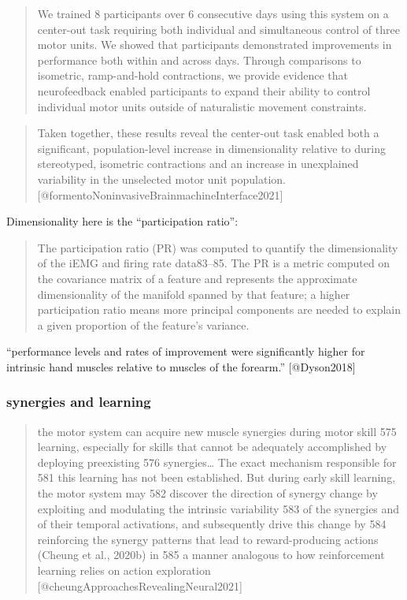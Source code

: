 \documentclass[../main.tex]{subfiles}
\begin{document}
{{{{{{{{{{{\begin{quote}
We trained 8 participants over 6 consecutive days using this system on a
center-out task requiring both individual and simultaneous control of
three motor units. We showed that participants demonstrated improvements
in performance both within and across days. Through comparisons to
isometric, ramp-and-hold contractions, we provide evidence that
neurofeedback enabled participants to expand their ability to control
individual motor units outside of naturalistic movement constraints.
\end{quote}

\begin{quote}
Taken together, these results reveal the center-out task enabled both a
significant, population-level increase in dimensionality relative to
during stereotyped, isometric contractions and an increase in
unexplained variability in the unselected motor unit population.
{[}@formentoNoninvasiveBrainmachineInterface2021{]}
\end{quote}

Dimensionality here is the ``participation ratio'':

\begin{quote}
The participation ratio (PR) was computed to quantify the dimensionality
of the iEMG and firing rate data83--85. The PR is a metric computed on
the covariance matrix of a feature and represents the approximate
dimensionality of the manifold spanned by that feature; a higher
participation ratio means more principal components are needed to
explain a given proportion of the feature's variance.
\end{quote}

``performance levels and rates of improvement were significantly higher
for intrinsic hand muscles relative to muscles of the forearm.''
{[}@Dyson2018{]}

\subsubsection{synergies and learning}\label{synergies-and-learning}

\begin{quote}
the motor system can acquire new muscle synergies during motor skill 575
learning, especially for skills that cannot be adequately accomplished
by deploying preexisting 576 synergies\ldots{} The exact mechanism
responsible for 581 this learning has not been established. But during
early skill learning, the motor system may 582 discover the direction of
synergy change by exploiting and modulating the intrinsic variability
583 of the synergies and of their temporal activations, and subsequently
drive this change by 584 reinforcing the synergy patterns that lead to
reward-producing actions (Cheung et al., 2020b) in 585 a manner
analogous to how reinforcement learning relies on action exploration
{[}@cheungApproachesRevealingNeural2021{]}
\end{quote}

}}}}}}}}}}}
\end{document}
